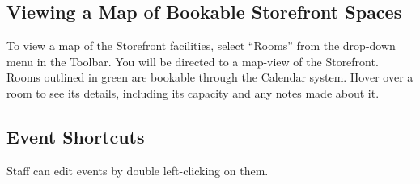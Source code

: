\subsection{Viewing a Map of Bookable Storefront Spaces}

To view a map of the Storefront facilities, select ``Rooms'' from the drop-down menu in the Toolbar. You will be directed to a map-view of the Storefront. Rooms outlined in green are bookable through the Calendar system. Hover over a room to see its details, including its capacity and any notes made about it.


\subsection{Event Shortcuts}

Staff can edit events by double left-clicking on them.


